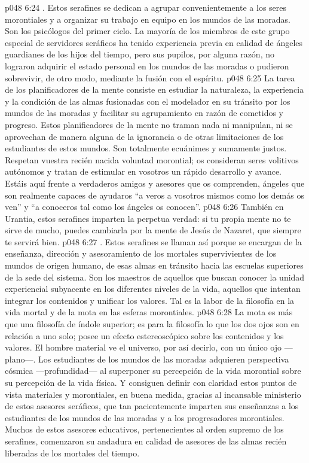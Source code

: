 \vs p048 6:24 . Estos serafines se dedican a agrupar convenientemente a los seres morontiales y a organizar su trabajo en equipo en los mundos de las moradas. Son los psicólogos del primer cielo. La mayoría de los miembros de este grupo especial de servidores seráficos ha tenido experiencia previa en calidad de ángeles guardianes de los hijos del tiempo, pero sus pupilos, por alguna razón, no lograron adquirir el estado personal en los mundos de las moradas o pudieron sobrevivir, de otro modo, mediante la fusión con el espíritu.
\vs p048 6:25 La tarea de los planificadores de la mente consiste en estudiar la naturaleza, la experiencia y la condición de las almas fusionadas con el modelador en su tránsito por los mundos de las moradas y facilitar su agrupamiento en razón de cometidos y progreso. Estos planificadores de la mente no traman nada ni manipulan, ni se aprovechan de manera alguna de la ignorancia o de otras limitaciones de los estudiantes de estos mundos. Son totalmente ecuánimes y sumamente justos. Respetan vuestra recién nacida voluntad morontial; os consideran seres volitivos autónomos y tratan de estimular en vosotros un rápido desarrollo y avance. Estáis aquí frente a verdaderos amigos y asesores que os comprenden, ángeles que son realmente capaces de ayudaros “a veros a vosotros mismos como los demás os ven” y “a conoceros tal como los ángeles os conocen”.
\vs p048 6:26 También en Urantia, estos serafines imparten la perpetua verdad: si tu propia mente no te sirve de mucho, puedes cambiarla por la mente de Jesús de Nazaret, que siempre te servirá bien.
\vs p048 6:27 . Estos serafines se llaman así porque se encargan de la enseñanza, dirección y asesoramiento de los mortales supervivientes de los mundos de origen humano, de esas almas en tránsito hacia las escuelas superiores de la sede del sistema. Son los maestros de aquellos que buscan conocer la unidad experiencial subyacente en los diferentes niveles de la vida, aquellos que intentan integrar los contenidos y unificar los valores. Tal es la labor de la filosofía en la vida mortal y de la mota en las esferas morontiales.
\vs p048 6:28 La mota es más que una filosofía de índole superior; es para la filosofía lo que los dos ojos son en relación a uno solo; posee un efecto estereoscópico sobre los contenidos y los valores. El hombre material ve el universo, por así decirlo, con un único ojo ---plano---. Los estudiantes de los mundos de las moradas adquieren perspectiva cósmica ---profundidad--- al superponer su percepción de la vida morontial sobre su percepción de la vida física. Y consiguen definir con claridad estos puntos de vista materiales y morontiales, en buena medida, gracias al incansable ministerio de estos asesores seráficos, que tan pacientemente imparten sus enseñanzas a los estudiantes de los mundos de las moradas y a los progresadores morontiales. Muchos de estos asesores educativos, pertenecientes al orden supremo de los serafines, comenzaron su andadura en calidad de asesores de las almas recién liberadas de los mortales del tiempo.
